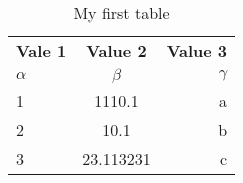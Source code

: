 \documentclass{article}
\begin{document}
\begin{table}[h!]
	\begin{center}
		\caption{My first table}
		\label{tab:table1}
		\begin{tabular}{l|c|r} %
			\textbf{Vale 1} & \textbf{Value 2} & \textbf{Value 3}\\
			$\alpha$ & $\beta$ & $\gamma$ \\
			\hline
			1 & 1110.1 & a\\
			2 & 10.1 & b\\
			3 & 23.113231 & c\\
			\end{tabular}
		\end{center}
	\end{table}
\end{document}
